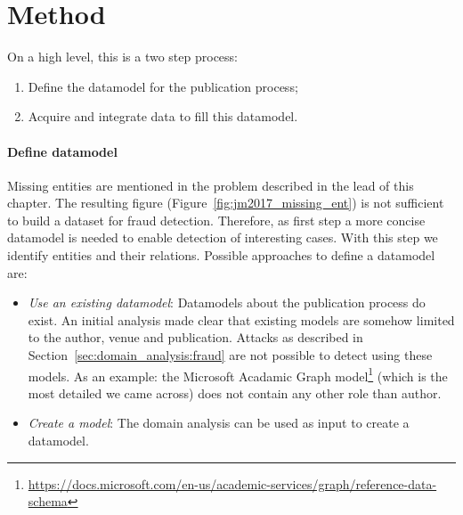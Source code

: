 \documentclass{ou-report}
\begin{document}
\newpage
\section{Method}
On a high level, this is a two step process:
\begin{enumerate}
    \item Define the datamodel for the publication process;
    \item Acquire and integrate data to fill this datamodel.
\end{enumerate}

\paragraph{Define datamodel}
Missing entities are mentioned in the problem described in the lead of this 
chapter. The resulting figure (Figure~\ref{fig:jm2017_missing_ent}) is not 
sufficient to build a dataset for fraud detection. Therefore, as first step a 
more concise datamodel is needed to enable detection of interesting cases. 
With this step we identify entities and their relations. Possible approaches 
to define a datamodel are:
\begin{itemize}
    \item \emph{Use an existing datamodel}: Datamodels about the publication 
    process do exist. An initial analysis made clear that existing models are
    somehow limited to the author, venue and publication. Attacks as described
    in Section~\ref{sec:domain_analysis:fraud} are not possible to detect using 
    these models. As an example: the Microsoft Acadamic Graph 
    model\footnote{\url{https://docs.microsoft.com/en-us/academic-services/graph/reference-data-schema}} 
    (which is the most detailed we came across) does not contain any other role 
    than author.
    \item \emph{Create a model}:  The domain analysis can be used as input to create
    a datamodel.
\end{itemize}
\end{document}
